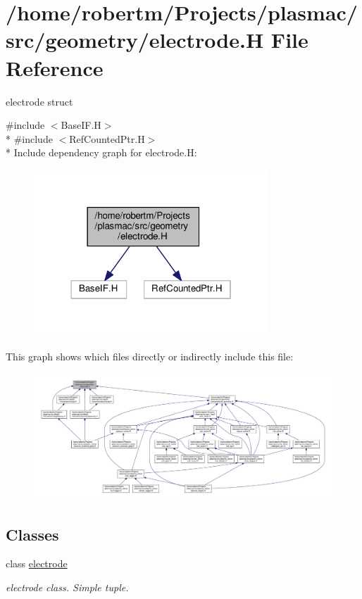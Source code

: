 \hypertarget{electrode_8H}{}\section{/home/robertm/\+Projects/plasmac/src/geometry/electrode.H File Reference}
\label{electrode_8H}


electrode struct  


{\ttfamily \#include $<$Base\+I\+F.\+H$>$}\\*
{\ttfamily \#include $<$Ref\+Counted\+Ptr.\+H$>$}\\*
Include dependency graph for electrode.\+H\+:\nopagebreak
\begin{figure}[H]
\begin{center}
\leavevmode
\includegraphics[width=250pt]{electrode_8H__incl}
\end{center}
\end{figure}
This graph shows which files directly or indirectly include this file\+:\nopagebreak
\begin{figure}[H]
\begin{center}
\leavevmode
\includegraphics[width=350pt]{electrode_8H__dep__incl}
\end{center}
\end{figure}
\subsection*{Classes}
\begin{DoxyCompactItemize}
\item 
class \hyperlink{classelectrode}{electrode}
\begin{DoxyCompactList}\small\item\em electrode class. Simple tuple. \end{DoxyCompactList}\end{DoxyCompactItemize}


